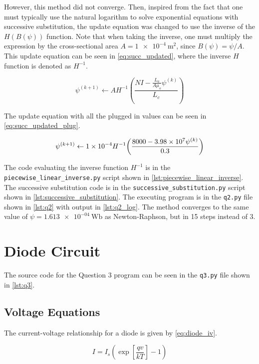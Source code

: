 \documentclass[a4paper,titlepage]{article}
\newcommand{\code}[1]{\texttt{#1}}
\begin{document}
	However, this method did not converge. Then, inspired from the fact that one must typically use the natural logarithm to solve exponential equations with successive substitution, the update equation was changed to use the inverse of the $H(B(\psi))$ function. Note that when taking the inverse, one must multiply the expression by the cross-sectional area $A = \SI{1e-4}{\meter\squared}$, since $B(\psi) = \psi / A$. This update equation can be seen in \cref{eq:succ_updated}, where the inverse $H$ function is denoted as $H^{-1}$.
	
	\begin{equation} \label{eq:succ_updated}
		\psi^{(k+1)} \leftarrow A H^{-1} \left( \frac{NI - \frac{L_a}{A \mu_o} \psi^{(k)}}{L_c} \right)
	\end{equation}
	
	The update equation with all the plugged in values can be seen in \cref{eq:succ_updated_plug}.
	
	\begin{equation} \label{eq:succ_updated_plug} \footnotesize
		\psi^{(k+1)} \leftarrow \SI{1e-4}{} H^{-1}{\left( \frac{8000 - \SI{3.98e7}{} \psi^{(k)}}{0.3} \right)}
	\end{equation}
	
	The code evaluating the inverse function $H^{-1}$ is in the \code{piecewise\_linear\_inverse.py} script shown in \cref{lst:piecewise_linear_inverse}. The successive substitution code is in the \code{successive\_substitution.py} script shown in \cref{lst:successive_substitution}. The executing program is in the \code{q2.py} file shown in \cref{lst:q2} with output in \cref{lst:q2_log}. The method converges to the same value of $\psi = \SI{1.613e-04}{\weber}$ as Newton-Raphson, but in 15 steps instead of 3.
	
	\section{Diode Circuit}
	The source code for the Question 3 program can be seen in the \texttt{q3.py} file shown in \cref{lst:q3}.
	
	\subsection{Voltage Equations}
	The current-voltage relationship for a diode is given by \cref{eq:diode_iv}.
	
	\begin{equation} \label{eq:diode_iv}
		I = I_s \left( \exp\left[{\frac{qv}{kT}}\right] - 1\right)
	\end{equation}
	
\end{document}
